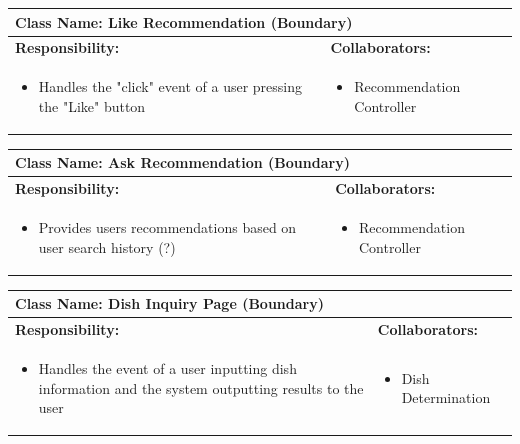\documentclass[]{article}
\begin{document}
\begin{table}[H]
	\centering
	\begin{tabular}{|p{7cm}|p{7cm}|}
	\hline 
	 \multicolumn{2}{|l|}{\textbf{Class Name:} Like Recommendation (Boundary)} \\
	\hline
	\textbf{Responsibility:} & \textbf{Collaborators:} \\
	\hline
	\raggedright
	\begin{itemize}
		\item Handles the "click" event of a user pressing the "Like" button
	\end{itemize}
	\vspace{1in} & 
	\begin{itemize}
		\item Recommendation Controller
	\end{itemize} \\
	\hline
	\end{tabular}
\end{table}

\begin{table}[H]
	\centering
	\begin{tabular}{|p{7cm}|p{7cm}|}
	\hline 
	 \multicolumn{2}{|l|}{\textbf{Class Name:} Ask Recommendation (Boundary)} \\
	\hline
	\textbf{Responsibility:} & \textbf{Collaborators:} \\
	\hline
	\raggedright
	\begin{itemize}
		\item Provides users recommendations based on user search history  (?)
	\end{itemize}
	\vspace{1in} & 
	\begin{itemize}
		\item Recommendation Controller
	\end{itemize} \\
	\hline
	\end{tabular}
\end{table}

\begin{table}[H]
	\centering
	\begin{tabular}{|p{7cm}|p{7cm}|}
	\hline 
	 \multicolumn{2}{|l|}{\textbf{Class Name:} Dish Inquiry Page (Boundary)} \\
	\hline
	\textbf{Responsibility:} & \textbf{Collaborators:} \\
	\hline
	\raggedright
	\begin{itemize}
		\item Handles the event of a user inputting dish information and the system outputting results to the user
	\end{itemize}
	\vspace{1in} & 
	\begin{itemize}
		\item Dish Determination
	\end{itemize} \\
	\hline
	\end{tabular}
\end{table}
\end{document}
